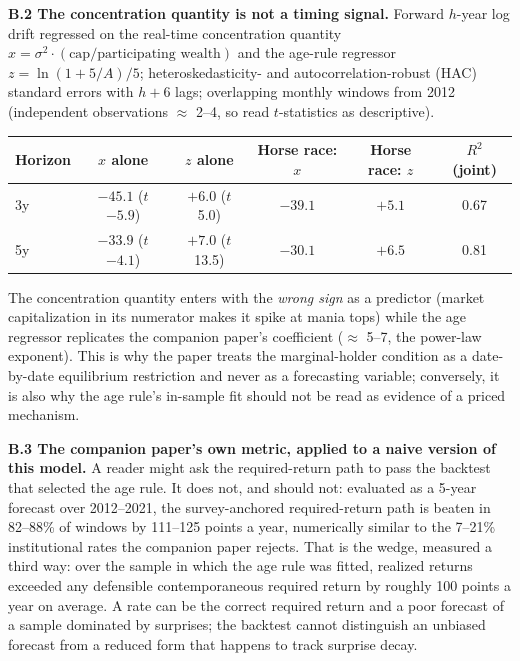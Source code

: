 \documentclass[11pt]{article}
\begin{document}
\textbf{B.2 The concentration quantity is not a timing signal.} Forward $h$-year log drift regressed on the real-time concentration quantity $x = \sigma^2 \cdot (\text{cap}/\text{participating wealth})$ and the age-rule regressor $z = \ln(1+5/A)/5$; heteroskedasticity- and autocorrelation-robust (HAC) standard errors with $h+6$ lags; overlapping monthly windows from 2012 (independent observations $\approx$ 2--4, so read $t$-statistics as descriptive).

\begin{table}[ht]\centering\small
\begin{tabular}{lccccc}
\toprule
Horizon & $x$ alone & $z$ alone & Horse race: $x$ & Horse race: $z$ & $R^2$ (joint) \\
\midrule
3y & $-45.1$ ($t$ $-5.9$) & $+6.0$ ($t$ 5.0) & $-39.1$ & $+5.1$ & 0.67 \\
5y & $-33.9$ ($t$ $-4.1$) & $+7.0$ ($t$ 13.5) & $-30.1$ & $+6.5$ & 0.81 \\
\bottomrule
\end{tabular}
\end{table}

The concentration quantity enters with the \emph{wrong sign} as a predictor (market capitalization in its numerator makes it spike at mania tops) while the age regressor replicates the companion paper's coefficient ($\approx$ 5--7, the power-law exponent). This is why the paper treats the marginal-holder condition as a date-by-date equilibrium restriction and never as a forecasting variable; conversely, it is also why the age rule's in-sample fit should not be read as evidence of a priced mechanism.

\textbf{B.3 The companion paper's own metric, applied to a naive version of this model.} A reader might ask the required-return path to pass the backtest that selected the age rule. It does not, and should not: evaluated as a 5-year forecast over 2012--2021, the survey-anchored required-return path is beaten in 82--88\% of windows by 111--125 points a year, numerically similar to the 7--21\% institutional rates the companion paper rejects. That is the wedge, measured a third way: over the sample in which the age rule was fitted, realized returns exceeded any defensible contemporaneous required return by roughly 100 points a year on average. A rate can be the correct required return and a poor forecast of a sample dominated by surprises; the backtest cannot distinguish an unbiased forecast from a reduced form that happens to track surprise decay.
\end{document}
